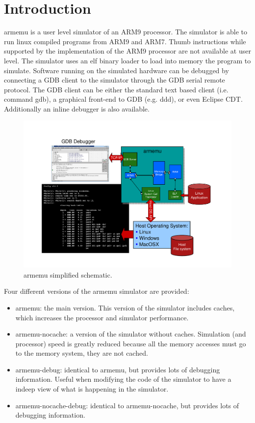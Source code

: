 \section{Introduction}

armemu is a user level simulator of an ARM9 processor. The simulator is able to run linux compiled programs from ARM9 and ARM7. Thumb instructions while supported by the implementation of the ARM9 processor are not available at user level. The simulator uses an elf binary loader to load into memory the program to simulate. Software running on the simulated hardware can be debugged by connecting a GDB client to the simulator through the GDB serial remote protocol. The GDB client can be either the standard text based client (i.e. command gdb), a graphical front-end to GDB (e.g. ddd), or even Eclipse CDT. Additionally an inline debugger is also available.

\begin{figure}[!h]
	\begin{center}
		\includegraphics[width=\textwidth]{armemu/fig_armemu.pdf}
	\end{center}
	\caption{armemu simplified schematic.}
	\label{fig:armemu_system}
\end{figure}

Four different versions of the armemu simulator are provided:
\begin{itemize}\addtolength{\itemsep}{-0.40\baselineskip}
\item armemu: the main version. This version of the simulator includes caches, which increases the processor and simulator performance.
\item armemu-nocache: a version of the simulator without caches. Simulation (and processor) speed is greatly reduced because all the memory accesses must go to the memory system, they are not cached.
\item armemu-debug: identical to armemu, but provides lots of debugging information. Useful when modifying the code of the simulator to have a indeep view of what is happening in the simulator.
\item armemu-nocache-debug: identical to armemu-nocache, but provides lots of debugging information.
\end{itemize}

